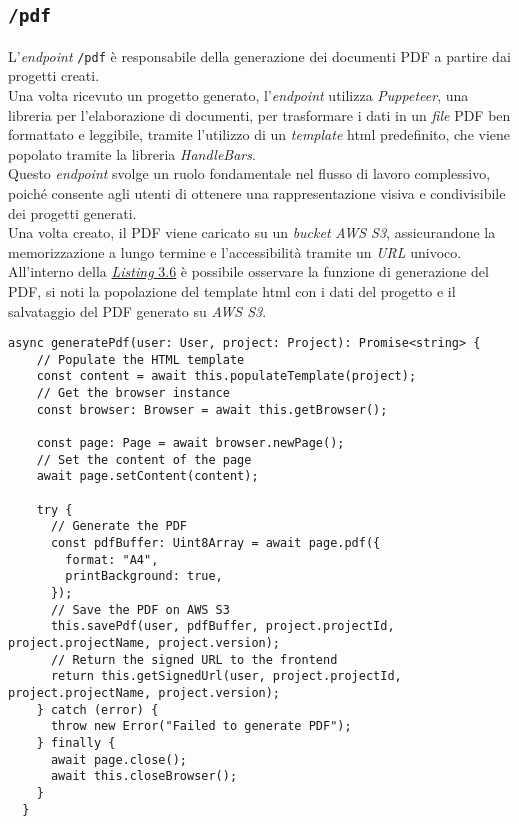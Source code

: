 \subsection*{\texttt{/pdf}}
L’\textit{endpoint} \texttt{/pdf} è responsabile della generazione dei documenti PDF a partire dai progetti creati.\\
Una volta ricevuto un progetto generato, l’\textit{endpoint} utilizza \textit{Puppeteer}, una libreria per l’elaborazione di documenti, per trasformare i dati in un \textit{file} PDF ben formattato e leggibile, tramite l'utilizzo di un \textit{template} \gls{html} predefinito, che viene popolato tramite la libreria \textit{HandleBars}.\\

\noindent Questo \textit{endpoint} svolge un ruolo fondamentale nel flusso di lavoro complessivo, poiché consente agli utenti di ottenere una rappresentazione visiva e condivisibile dei progetti generati.\\
Una volta creato, il PDF viene caricato su un \textit{bucket} \textit{AWS S3}, assicurandone la memorizzazione a lungo termine e l’accessibilità tramite un \textit{URL} univoco.\\ 

\noindent All'interno della {\hyperref[lst:funzione-generazione-pdf]{\textit{Listing} 3.6}} è possibile osservare la funzione di generazione del PDF, si noti la popolazione del template \gls{html} con i dati del progetto e il salvataggio del PDF generato su \textit{AWS S3}.
\begin{lstlisting}[caption={Funzione di generazione del PDF, con salvataggio su \textit{AWS S3}}, label={lst:funzione-generazione-pdf}]
async generatePdf(user: User, project: Project): Promise<string> {
    // Populate the HTML template    
    const content = await this.populateTemplate(project);  
    // Get the browser instance
    const browser: Browser = await this.getBrowser(); 

    const page: Page = await browser.newPage();
    // Set the content of the page
    await page.setContent(content); 

    try {
      // Generate the PDF
      const pdfBuffer: Uint8Array = await page.pdf({
        format: "A4",
        printBackground: true,
      }); 
      // Save the PDF on AWS S3
      this.savePdf(user, pdfBuffer, project.projectId, project.projectName, project.version);  
      // Return the signed URL to the frontend
      return this.getSignedUrl(user, project.projectId, project.projectName, project.version);
    } catch (error) {
      throw new Error("Failed to generate PDF");
    } finally {
      await page.close();
      await this.closeBrowser();
    }
  }
\end{lstlisting}